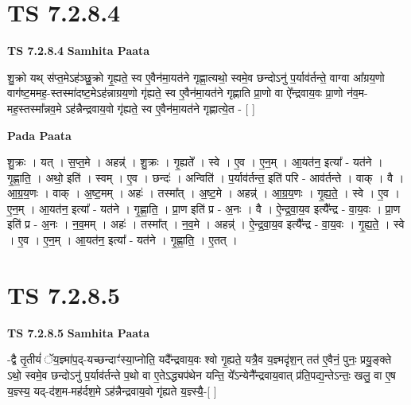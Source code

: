 \documentclass[17pt]{extarticle}
\begin{document}
\section*{ TS 7.2.8.4 }

\textbf{TS 7.2.8.4 } \newline
\textbf{Samhita Paata} \newline

शु॒क्रो यथ् स॑प्त॒मेऽह॑ञ्छु॒क्रो गृ॒ह्यते॒ स्व ए॒वैन॑मा॒यत॑ने गृह्णा॒त्यथो॒ स्वमे॒व छन्दोऽनु॑ प॒र्याव॑र्तन्ते॒ वाग्वा आ᳚ग्रय॒णो वाग॑ष्ट॒ममह॒-स्तस्मा॑दष्ट॒मेऽह॑न्नाग्रय॒णो गृ॑ह्यते॒ स्व ए॒वैन॑मा॒यत॑ने गृह्णाति प्रा॒णो वा ऐ᳚न्द्रवाय॒वः प्रा॒णो न॑व॒म-मह॒स्तस्मा᳚न्नव॒मे ऽह॑न्नैन्द्रवाय॒वो गृ॑ह्यते॒ स्व ए॒वैन॑मा॒यत॑ने गृह्णात्ये॒त - [  ] \newline

\textbf{Pada Paata} \newline

शु॒क्रः । यत् । स॒प्त॒मे । अहन्न्॑ । शु॒क्रः । गृ॒ह्यते᳚ । स्वे । ए॒व । ए॒न॒म् । आ॒यत॑न॒ इत्या᳚ - यत॑ने । गृ॒ह्णा॒ति॒ । अथो॒ इति॑ । स्वम् । ए॒व । छन्दः॑ । अन्विति॑ । प॒र्याव॑र्तन्त॒ इति॑ परि - आव॑र्तन्ते । वाक् । वै । आ॒ग्र॒य॒णः । वाक् । अ॒ष्ट॒मम् । अहः॑ । तस्मा᳚त् । अ॒ष्ट॒मे । अहन्न्॑ । आ॒ग्र॒य॒णः । गृ॒ह्य॒ते॒ । स्वे । ए॒व । ए॒न॒म् । आ॒यत॑न॒ इत्या᳚ - यत॑ने । गृ॒ह्णा॒ति॒ । प्रा॒ण इति॑ प्र - अ॒नः । वै । ऐ॒न्द्र॒वा॒य॒व इत्यै᳚न्द्र - वा॒य॒वः । प्रा॒ण इति॑ प्र - अ॒नः । न॒व॒मम् । अहः॑ । तस्मा᳚त् । न॒व॒मे । अहन्न्॑ । ऐ॒न्द्र॒वा॒य॒व इत्यै᳚न्द्र - वा॒य॒वः । गृ॒ह्य॒ते॒ । स्वे । ए॒व । ए॒न॒म् । आ॒यत॑न॒ इत्या᳚ - यत॑ने । गृ॒ह्णा॒ति॒ । ए॒तत् ।  \newline




\section*{ TS 7.2.8.5 }

\textbf{TS 7.2.8.5 } \newline
\textbf{Samhita Paata} \newline

-द्वै तृ॒तीयं॑ ॅय॒ज्ञ्मा॑प॒द्-यच्छन्दाꣳ॑स्या॒प्नोति॒ यदै᳚न्द्रवाय॒वः श्वो गृ॒ह्यते॒ यत्रै॒व य॒ज्ञ्मदृ॑श॒न् तत॑ ए॒वैनं॒ पुनः॒ प्रयु॒ङ्क्ते ऽथो॒ स्वमे॒व छन्दोऽनु॑ प॒र्याव॑र्तन्ते प॒थो वा ए॒तेऽद्ध्यप॑थेन यन्ति॒ ये᳚ऽन्येनै᳚न्द्रवाय॒वात् प्र॑ति॒पद्य॒न्तेऽन्तः॒ खलु॒ वा ए॒ष य॒ज्ञ्स्य॒ यद्-द॑श॒म-मह॑र्दश॒मे ऽह॑न्नैन्द्रवाय॒वो गृ॑ह्यते य॒ज्ञ्स्यै॒-[  ] \newline
\end{document}
